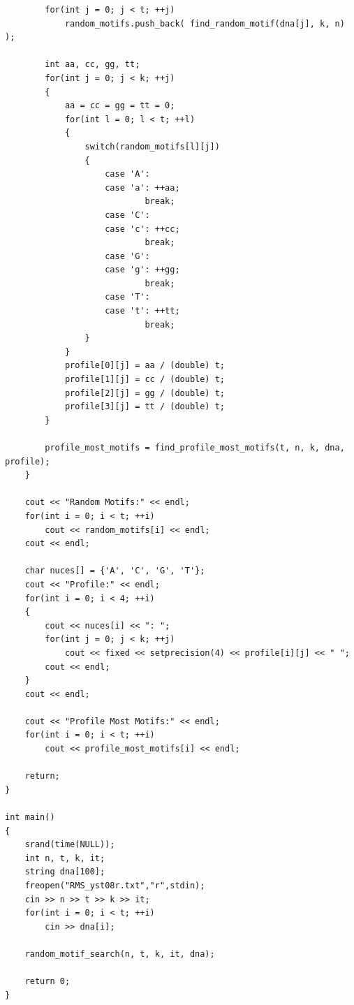 \documentclass{report}
\begin{document}
\begin{verbatim}
        for(int j = 0; j < t; ++j)
            random_motifs.push_back( find_random_motif(dna[j], k, n) );

        int aa, cc, gg, tt;
        for(int j = 0; j < k; ++j)
        {
            aa = cc = gg = tt = 0;
            for(int l = 0; l < t; ++l)
            {
                switch(random_motifs[l][j])
                {
                    case 'A':
                    case 'a': ++aa;
                            break;
                    case 'C':
                    case 'c': ++cc;
                            break;
                    case 'G':
                    case 'g': ++gg;
                            break;
                    case 'T':
                    case 't': ++tt;
                            break;
                }
            }
            profile[0][j] = aa / (double) t;
            profile[1][j] = cc / (double) t;
            profile[2][j] = gg / (double) t;
            profile[3][j] = tt / (double) t;
        }

        profile_most_motifs = find_profile_most_motifs(t, n, k, dna, profile);
    }

    cout << "Random Motifs:" << endl;
    for(int i = 0; i < t; ++i)
        cout << random_motifs[i] << endl;
    cout << endl;

    char nuces[] = {'A', 'C', 'G', 'T'};
    cout << "Profile:" << endl;
    for(int i = 0; i < 4; ++i)
    {
        cout << nuces[i] << ": ";
        for(int j = 0; j < k; ++j)
            cout << fixed << setprecision(4) << profile[i][j] << " ";
        cout << endl;
    }
    cout << endl;

    cout << "Profile Most Motifs:" << endl;
    for(int i = 0; i < t; ++i)
        cout << profile_most_motifs[i] << endl;

    return;
}

int main()
{
    srand(time(NULL));
    int n, t, k, it;
    string dna[100];
    freopen("RMS_yst08r.txt","r",stdin);
    cin >> n >> t >> k >> it;
    for(int i = 0; i < t; ++i)
        cin >> dna[i];

    random_motif_search(n, t, k, it, dna);

    return 0;
}

\end{verbatim}
\end{document}
